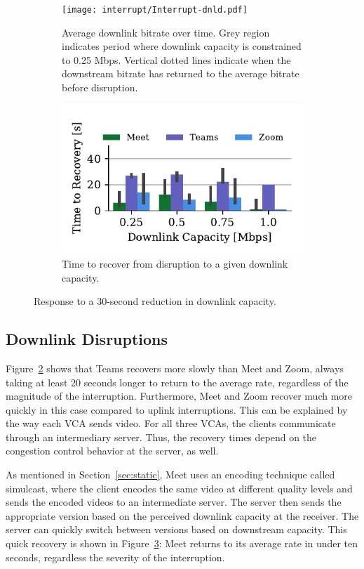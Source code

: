 \begin{figure}[t!]
 \centering
\begin{subfigure}[t]{.5\textwidth}
   \centering
    \texttt{[image: interrupt/Interrupt-dnld.pdf]}
    \caption{Average downlink bitrate over time. Grey region indicates period where downlink capacity is constrained to 0.25 Mbps. Vertical dotted lines indicate when the downstream bitrate has returned to the average bitrate before disruption.}
    \label{fig:ts-dnld}
\end{subfigure}
\begin{subfigure}[t]{.5\textwidth}
  \centering
    \includegraphics[width=.7\textwidth,keepaspectratio]{figures/interrupt/TTR-dnld.pdf}
    \caption{Time to recover from disruption to a given downlink capacity.}
    \label{fig:TTR_dnld}
\end{subfigure}
\caption{Response to a 30-second reduction in downlink capacity.}
\label{fig:interrupt-dnld}
\end{figure}

\subsection{Downlink Disruptions}

Figure~\ref{fig:TTR_dnld} shows that Teams recovers more slowly than Meet and
Zoom, always taking at least 20 seconds longer to return to the average rate,
regardless of the magnitude of the interruption. Furthermore, Meet and Zoom
recover much more quickly in this case compared to uplink interruptions. This
can be explained by the way each VCA sends video. For all three VCAs, the
clients communicate through an intermediary server. Thus, the recovery times
depend on the congestion control behavior at the server, as well. 

As mentioned in Section~\ref{sec:static}, Meet uses an encoding technique
called simulcast, where the client encodes the same video at different quality
levels and sends the encoded videos to an intermediate server. The server then
sends the appropriate version based on the perceived downlink capacity at the
receiver. The server can quickly switch between versions based on downstream
capacity. This quick recovery is shown in
Figure~\ref{fig:interrupt-dnld}: Meet returns to its average rate in under ten
seconds, regardless the severity of the interruption.


